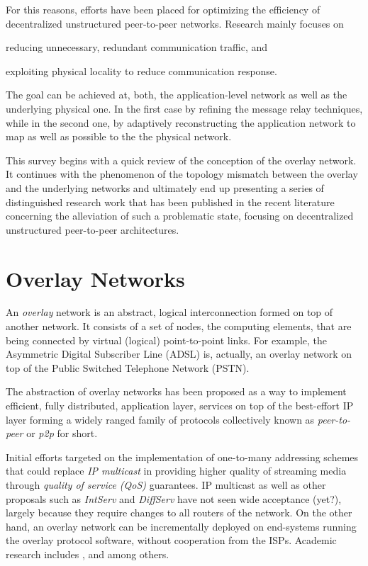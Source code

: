 \documentclass[a4paper,10pt]{article}
\begin{document}
For this reasons, efforts have been placed for optimizing the efficiency of decentralized unstructured peer-to-peer networks. Research mainly focuses on
\begin{inparaenum}
  \item reducing unnecessary, redundant communication traffic, and
  \item exploiting physical locality to reduce communication response.
\end{inparaenum}
The goal can be achieved at, both, the application-level network as well as the underlying physical one. In the first case by refining the message relay techniques, while in the second one, by adaptively reconstructing the application network to map as well as possible to the the physical network.

This survey begins with a quick review of the conception of the overlay network. It continues with the phenomenon of the topology mismatch between the overlay and the underlying networks and ultimately end up presenting a series of distinguished research work that has been published in the recent literature concerning the alleviation of such a problematic state, focusing on decentralized unstructured peer-to-peer architectures.

\section{Overlay Networks}
An \emph{overlay} network is an abstract, logical interconnection formed on top of another network. It consists of a set of nodes, the computing elements, that are being connected by virtual (logical) point-to-point links. For example, the Asymmetric Digital Subscriber Line (ADSL) is, actually, an overlay network on top of the Public Switched Telephone Network (PSTN).

The abstraction of overlay networks has been proposed as a way to implement efficient, fully distributed, application layer, services on top of the best-effort IP layer forming a widely ranged family of protocols collectively known as \emph{peer-to-peer} or \emph{p2p} for short.

Initial efforts targeted on the implementation of one-to-many addressing schemes that could replace \emph{IP multicast} in providing higher quality of streaming media through \emph{quality of service (QoS)} guarantees. IP multicast as well as other proposals such as \emph{IntServ} and \emph{DiffServ}\cite{cisco_diffserv_2005} have not seen wide acceptance (yet?), largely because they require changes to all routers of the network. On the other hand, an overlay network can be incrementally deployed on end-systems running the overlay protocol software, without cooperation from the ISPs. Academic research includes \cite{chu_esm_2000}, \cite{jannotti_overcast_2000} and \cite{kwon_tag_2002} among others.
\end{document}
